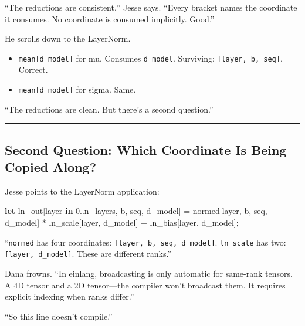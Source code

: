 \documentclass[11pt,]{article}
\newenvironment{Shaded}{}{}
\newcommand{\DecValTok}[1]{\textcolor[rgb]{0.25,0.63,0.44}{#1}}
\newcommand{\KeywordTok}[1]{\textcolor[rgb]{0.00,0.44,0.13}{\textbf{#1}}}
\newcommand{\NormalTok}[1]{#1}
\newcommand{\OperatorTok}[1]{\textcolor[rgb]{0.40,0.40,0.40}{#1}}
\providecommand{\tightlist}{%
  \setlength{\itemsep}{0pt}\setlength{\parskip}{0pt}}
\begin{document}
``The reductions are consistent,'' Jesse says. ``Every bracket names the
coordinate it consumes. No coordinate is consumed implicitly. Good.''

He scrolls down to the LayerNorm.

\begin{itemize}
\tightlist
\item
  \texttt{mean{[}d\_model{]}} for mu. Consumes \texttt{d\_model}.
  Surviving: \texttt{{[}layer,\ b,\ seq{]}}. Correct.
\item
  \texttt{mean{[}d\_model{]}} for sigma. Same.
\end{itemize}

``The reductions are clean. But there's a second question.''

\begin{center}\rule{0.5\linewidth}{0.4pt}\end{center}

\hypertarget{second-question-which-coordinate-is-being-copied-along}{%
\subsection{Second Question: Which Coordinate Is Being Copied
Along?}\label{second-question-which-coordinate-is-being-copied-along}}

Jesse points to the LayerNorm application:

\begin{Shaded}
\begin{Highlighting}[]
\KeywordTok{let}\NormalTok{ ln_out}\OperatorTok{[}\NormalTok{layer }\KeywordTok{in} \DecValTok{0.}\NormalTok{.n_layers, b, seq, d_model}\OperatorTok{]}\NormalTok{ =}
\NormalTok{    normed}\OperatorTok{[}\NormalTok{layer, b, seq, d_model}\OperatorTok{]}\NormalTok{ * ln_scale}\OperatorTok{[}\NormalTok{layer, d_model}\OperatorTok{]}
\NormalTok{    + ln_bias}\OperatorTok{[}\NormalTok{layer, d_model}\OperatorTok{]}\NormalTok{;}
\end{Highlighting}
\end{Shaded}

``\texttt{normed} has four coordinates:
\texttt{{[}layer,\ b,\ seq,\ d\_model{]}}. \texttt{ln\_scale} has two:
\texttt{{[}layer,\ d\_model{]}}. These are different ranks.''

Dana frowns. ``In einlang, broadcasting is only automatic for same-rank
tensors. A 4D tensor and a 2D tensor---the compiler won't broadcast
them. It requires explicit indexing when ranks differ.''

``So this line doesn't compile.''
\end{document}
